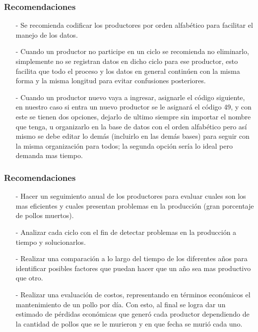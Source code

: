 \documentclass[11pt]{beamer}
\begin{document}
\begin{frame}
\frametitle{Recomendaciones}
\begin{itemize}
\justifying
\item[-]Se recomienda codificar los productores por orden alfabético para facilitar el manejo de los datos.
\item[-]Cuando un productor no participe en un ciclo se recomienda no eliminarlo, simplemente no se registran datos en dicho ciclo para ese productor, esto facilita que todo el proceso y los datos en general continúen con la misma forma y la misma longitud para evitar confusiones posteriores.
\item[-]Cuando un productor nuevo vaya a ingresar, asignarle el código siguiente, en nuestro caso si entra un nuevo productor se le asignará el código 49, y con este se tienen dos opciones, dejarlo de ultimo siempre sin importar el nombre que tenga, u organizarlo en la base de datos con el orden alfabético pero así mismo se debe editar lo demás (incluirlo en las demás bases) para seguir con la misma organización para todos; la segunda opción sería lo ideal pero demanda mas tiempo.
\end{itemize}
\end{frame}

\begin{frame}
\frametitle{Recomendaciones}
\begin{itemize}
\justifying
\item[-]Hacer un seguimiento anual de los productores para evaluar cuales son los mas eficientes y cuales presentan problemas en la producción (gran porcentaje de pollos muertos).
\item[-]Analizar cada ciclo con el fin de detectar problemas en la producción a tiempo y solucionarlos.
\item[-]Realizar una comparación a lo largo del tiempo de los diferentes años para identificar posibles factores que puedan hacer que un año sea mas productivo que otro.
\item[-]Realizar una evaluación de costos, representando en términos económicos el mantenimiento de un pollo por día. Con esto, al final se logra dar un estimado de pérdidas económicas que generó cada productor dependiendo de la cantidad de pollos que se le murieron y en que fecha se murió cada uno.
\end{itemize}
\end{frame}
\end{document}
